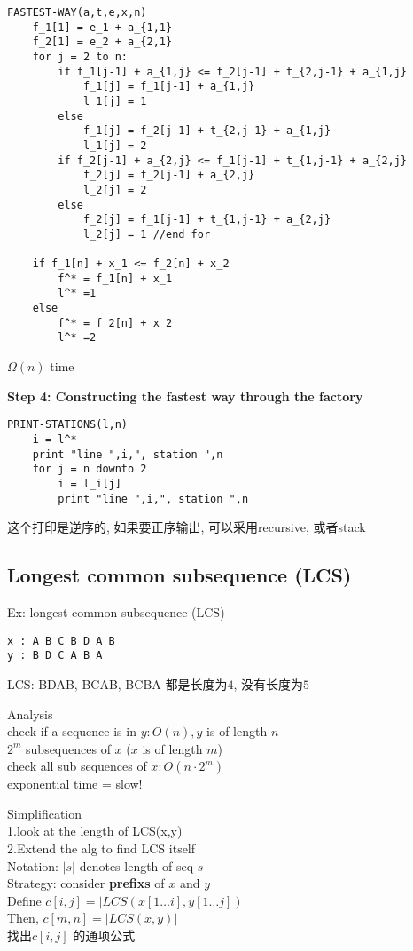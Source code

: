 \documentclass{article}
\begin{document}
\begin{verbatim}
FASTEST-WAY(a,t,e,x,n)
    f_1[1] = e_1 + a_{1,1}
    f_2[1] = e_2 + a_{2,1}
    for j = 2 to n:
        if f_1[j-1] + a_{1,j} <= f_2[j-1] + t_{2,j-1} + a_{1,j}
            f_1[j] = f_1[j-1] + a_{1,j}
            l_1[j] = 1
        else
            f_1[j] = f_2[j-1] + t_{2,j-1} + a_{1,j}
            l_1[j] = 2
        if f_2[j-1] + a_{2,j} <= f_1[j-1] + t_{1,j-1} + a_{2,j}
            f_2[j] = f_2[j-1] + a_{2,j}
            l_2[j] = 2
        else
            f_2[j] = f_1[j-1] + t_{1,j-1} + a_{2,j}
            l_2[j] = 1 //end for

    if f_1[n] + x_1 <= f_2[n] + x_2
        f^* = f_1[n] + x_1
        l^* =1
    else
        f^* = f_2[n] + x_2
        l^* =2
\end{verbatim}

\noindent
$\Omega(n)$ time

\textbf{Step 4: Constructing the fastest way through the factory}
\begin{verbatim}
PRINT-STATIONS(l,n)
    i = l^*
    print "line ",i,", station ",n
    for j = n downto 2
        i = l_i[j]
        print "line ",i,", station ",n
\end{verbatim}
这个打印是逆序的, 如果要正序输出, 可以采用recursive, 或者stack

\subsection{Longest common subsequence (LCS)}
Ex: longest common subsequence (LCS)
\begin{verbatim}
x : A B C B D A B
y : B D C A B A
\end{verbatim}
LCS: BDAB, BCAB, BCBA 都是长度为$4$, 没有长度为$5$

\bigskip
Analysis\\
check if a sequence is in $y:O(n), y$ is of length $n$\\
$2^m$ subsequences of $x$ ($x$ is of length $m$)\\
check all sub sequences of $x: O(n \cdot 2^m)$\\
exponential time = slow!

\bigskip
Simplification\\
1.look at the length of LCS(x,y)\\
2.Extend the alg to find LCS itself\\
Notation: $|s|$ denotes length of seq $s$\\
Strategy: consider \textbf{prefixs} of $x$ and $y$\\
Define $c[i,j] = |LCS(x[1… i], y[1…j])|$\\
Then, $c[m,n] = |LCS(x,y)|$\\
找出$c[i,j]$ 的通项公式
\end{document}
